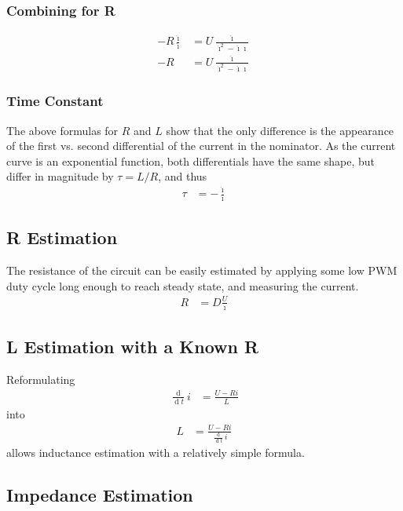 \documentclass[12pt,a4paper,oneside,openany]{article}
\DeclareMathOperator{\ud}{d}
\begin{document}
\subsubsection{Combining for R}
\begin{align}
- R \frac{\dot{\imath}}{\ddot{\imath}} &= U \frac{ \dot{\imath}}{ \dot{\imath}^2 - \ddot{\imath} \imath} \\
- R &= U \frac{ \ddot{\imath}}{ \dot{\imath}^2 - \ddot{\imath} \imath}
\end{align}

\subsubsection{Time Constant}

The above formulas for $R$ and $L$ show that the only difference is the appearance of the first vs. second differential of the current in the nominator. As the current curve is an exponential function, both differentials have the same shape, but differ in magnitude by $\tau=L/R$, and thus 
\begin{align}
\tau &= - \frac{\dot{\imath}}{\ddot{\imath}}
\end{align}

\subsection{R Estimation}

The resistance of the circuit can be easily estimated by applying some low PWM duty cycle long enough to reach steady state, and measuring the current.
\begin{align}
R &= D\frac{U}{\imath}
\end{align}

\subsection{L Estimation with a Known R}

Reformulating
\begin{align}
\frac{\ud}{\ud t} i &= \frac{U - R i}{L}
\end{align}
into
\begin{align}
L &= \frac{U - R i}{\frac{\ud}{\ud t} i}
\end{align}
allows inductance estimation with a relatively simple formula.

\subsection{Impedance Estimation}
\end{document}
